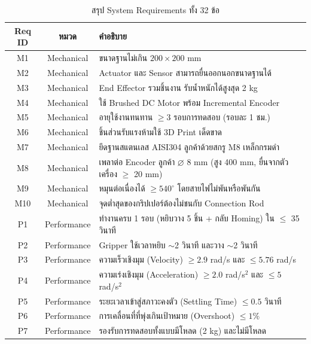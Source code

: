 \begin{table}[H]
  \centering
  \caption{สรุป System Requirements ทั้ง 32 ข้อ}
  \label{tab:req_summary}
  \small
  \begin{tabular}{|c|c|p{10cm}|}
    \hline
    \textbf{Req ID} & \textbf{หมวด} & \textbf{คำอธิบาย} \\
    \hline
    M1  & Mechanical & ขนาดฐานไม่เกิน $200 \times 200$ mm \\
    \hline
    M2  & Mechanical & Actuator และ Sensor สามารถยื่นออกนอกขนาดฐานได้ \\
    \hline
    M3  & Mechanical & End Effector รวมชิ้นงาน รับน้ำหนักได้สูงสุด 2 kg \\
    \hline
    M4  & Mechanical & ใช้ Brushed DC Motor พร้อม Incremental Encoder \\
    \hline
    M5  & Mechanical & อายุใช้งานทนทาน $\geq 3$ รอบการทดสอบ (รอบละ 1 ชม.) \\
    \hline
    M6  & Mechanical & ชิ้นส่วนรับแรงห้ามใช้ 3D Print เด็ดขาด \\
    \hline
    M7  & Mechanical & ยึดฐานสแตนเลส AISI304 ลูกค้าด้วยสกรู M8 เหล็กกรมดำ \\
    \hline
    M8  & Mechanical & เพลาต่อ Encoder ลูกค้า $\varnothing$ 8 mm (สูง 400 mm, ยื่นจากตัวเครื่อง $\geq$ 20 mm) \\
    \hline
    M9  & Mechanical & หมุนต่อเนื่องได้ $\geq 540^{\circ}$ โดยสายไฟไม่พันหรือพันกัน \\
    \hline
    M10 & Mechanical & จุดต่ำสุดของกริปเปอร์ต้องไม่ชนกับ Connection Rod \\
    \hline
    P1  & Performance & ทำงานครบ 1 รอบ (หยิบวาง 5 ชิ้น + กลับ Homing) ใน $\leq$ 35 วินาที \\
    \hline
    P2  & Performance & Gripper ใช้เวลาหยิบ $\sim$2 วินาที และวาง $\sim$2 วินาที \\
    \hline
    P3  & Performance & ความเร็วเชิงมุม (Velocity) $\geq 2.9$ rad/s และ $\leq 5.76$ rad/s \\
    \hline
    P4  & Performance & ความเร่งเชิงมุม (Acceleration) $\geq 2.0$ rad/s$^2$ และ $\leq 5$ rad/s$^2$ \\
    \hline
    P5  & Performance & ระยะเวลาเข้าสู่สภาวะคงตัว (Settling Time) $\leq 0.5$ วินาที \\
    \hline
    P6  & Performance & การเคลื่อนที่ที่พุ่งเกินเป้าหมาย (Overshoot) $\leq 1\%$ \\
    \hline
    P7  & Performance & รองรับการทดสอบทั้งแบบมีโหลด (2 kg) และไม่มีโหลด \\
    \hline

\end{tabular}
\end{table}
